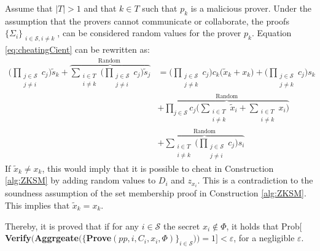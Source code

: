 Assume that $|T|>1$ and that $k\in T$ such that  $p_k$ is a malicious prover. Under the assumption that the provers cannot communicate or collaborate, the proofs $\{\Sigma_i\}_{\substack{i\in\mathcal{S}, i\neq k}}$, can be considered random values for the  prover $p_k$. Equation \eqref{eq:cheatingCient} can be rewritten as:
\begin{align*}
\big(\prod_{\substack{j\in\mathcal{S}\\ j\neq i}} c_j \big) \tilde{s}_k +  \overbrace{\sum_{\substack{i\in T \\ i\neq k}} \big(\prod_{\substack{j\in\mathcal{S}\\ j\neq i}} c_j \big) \tilde{s}_j}^{\text{Random }}  &=
  \big ( \prod_{\substack{j\in\mathcal{S}\\ j\neq k}} c_j \big)c_k \big( \tilde{x}_k + x_k\big) +\big( \prod_{\substack{j\in\mathcal{S}\\ j\neq k}} c_j\big) s_k 
  \\ 
   &+ \overbrace{\prod_{j\in\mathcal{S}} c_j \big(\sum_{\substack{i\in T \\ i\neq k}} \tilde{x}_i + \sum_{\substack{i\in T \\ i\neq k}} x_i\big)}^{\text{Random}} \\
   & + \overbrace{\sum_{\substack{i\in T \\ i\neq k}} \big( \prod_{\substack{j\in\mathcal{S}\\ j\neq i}} c_j\big) s_i  }^{\text{Random}}
\end{align*}
If $\tilde{x}_k \neq x_k$, this would imply that it is possible to cheat in Construction \ref{alg:ZKSM} by adding random values to $D_i$ and $z_{x_i}$. This is a contradiction to the soundness assumption of the set membership proof in Construction \ref{alg:ZKSM}. This implies that $\tilde{x}_k=x_k$. 

Thereby, it is proved that if for any $i\in\mathcal{S}$ the secret  $x_i\notin \Phi$, it holds that Prob$[ $\textbf{Verify}$($\textbf{Aggrgeate}$(\{$\textbf{Prove}$(pp,i,C_i,x_i,\Phi)\}_{i\in\mathcal{S}}) ) = 1] < \varepsilon$, for a negligible $\varepsilon$.

